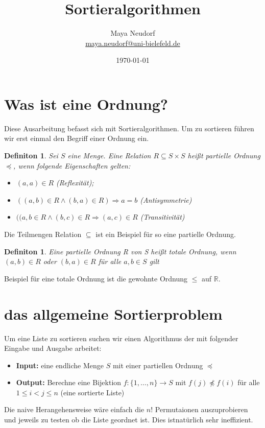 \documentclass{article}
\title{Sortieralgorithmen}
\date{\today}
\author{Maya Neudorf\\ \url{maya.neudorf@uni-bielefeld.de}}
\newtheorem{defn}[thm]{Definiton}
\begin{document}
\newpage
\maketitle
\tableofcontents
\newpage
\section{Was ist eine Ordnung?}
Diese Ausarbeitung befasst sich mit Sortieralgorithmen. Um zu sortieren führen wir erst einmal den Begriff einer Ordnung ein. 
\begin{defn}
 Sei $S$ eine Menge. Eine Relation $R \subseteq S \times S$ heißt partielle Ordnung $\preceq$, wenn folgende Eigenschaften gelten:
    \begin{itemize}
        \item[(a)] $(a,a) \in R$  (Reflexität);
        \item[(b)]$((a,b) \in R \wedge (b,a) \in R) \Rightarrow a=b$  (Antisymmetrie)
	\item [(c)]$((a,b \in R \wedge (b,c) \in R \Rightarrow (a,c) \in R$  (Transitivität)
    \end{itemize}
\end{defn}
Die Teilmengen Relation $\subseteq$ ist ein Beispiel für so eine partielle Ordnung.
\begin{defn}
 Eine partielle Ordnung R von S heißt totale Ordnung, wenn $(a,b) \in R$ oder $(b,a) \in R$ für alle $a,b \in S$ gilt 
\end{defn}
Beispiel für eine totale Ordnung ist die gewohnte Ordnung $\le$ auf          $\mathbb{R}$.

\section{das allgemeine Sortierproblem}

Um eine Liste zu sortieren suchen wir einen Algorithmus der mit folgender Eingabe und Ausgabe arbeitet:
\begin{itemize}
\item \textbf{Input:}
eine endliche Menge $S$ mit einer partiellen Ordnung $\preceq$
\\
\item \textbf{Output:}
Berechne eine Bijektion $f \colon \{1,\dots,n\} \to S$ mit $f(j) \not\preceq f(i)$ für alle $1\le i<j \le n$ (eine sortierte Liste)
\end{itemize}
Die naive Herangehensweise wäre einfach die $n!$ Permutaionen auszuprobieren und jeweils zu testen ob die Liste geordnet ist. Dies istnatürlich sehr ineffizient.
\end{document}
